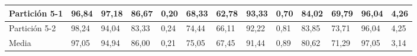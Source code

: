 \documentclass[10pt,a4paper]{article}
\begin{document}
\begin{table}[H]
{\begin{tabular}{l|l|l|l|l|l|l|l|l|l|l|l|l|}
\multicolumn{1}{|l|}{Partición 5-1} & 96,84        & 97,18         & 86,67   & 0,20 & 68,33        & 62,78         & 93,33   & 0,70 & 84,02        & 69,79         & 96,04   & 4,26 \\ \hline
\multicolumn{1}{|l|}{Partición 5-2} & 98,24        & 94,04         & 83,33   & 0,24 & 74,44        & 66,11         & 92,22   & 0,81 & 83,85        & 73,71         & 96,04   & 4,25 \\ \hline
\multicolumn{1}{|l|}{Media}         & 97,05        & 94,94         & 86,00   & 0,21 & 75,05        & 67,45         & 91,44   & 0,89 & 80,62        & 71,29         & 97,05   & 3,14 \\ \hline
\end{tabular}}
\end{table}

\end{document}
